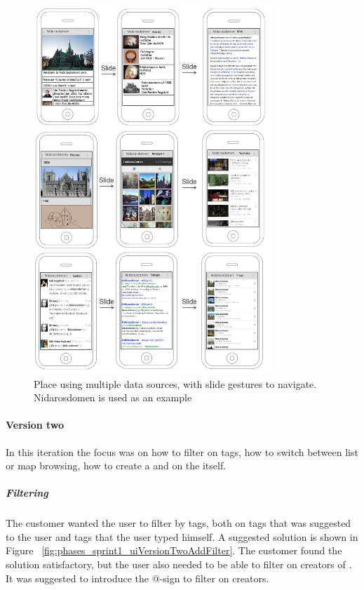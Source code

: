 \documentclass[11pt]{book}
\begin{document}
\begin{figure}[H]
    \centering
    \includegraphics[width=0.8\textwidth]{Figures/Phases/Sprint1/versiononeMultipleDataSourcesWall2.png}
    \caption{Place using multiple data sources, with slide gestures to navigate. Nidarosdomen is used as an example}
    \label{fig:phases_sprint1_uiVersionOneMultipleDataSoruces}
\end{figure}

\paragraph{Version two}

In this iteration the focus was on how to filter \wallentityp on tags, how to switch between list or map browsing, how to create a \wallentitys and on the \wallentitys itself. 

\subparagraph{Filtering \wallentityp}
The customer wanted the user to filter by tags, both on tags that was suggested to the user and tags that the user typed himself. A suggested solution is shown in Figure ~\ref{fig:phases_sprint1_uiVersionTwoAddFilter}. The customer found the solution satisfactory, but the user also needed to be able to filter on creators of \wallentityp. It was suggested to introduce the @-sign to filter on creators.
\end{document}
